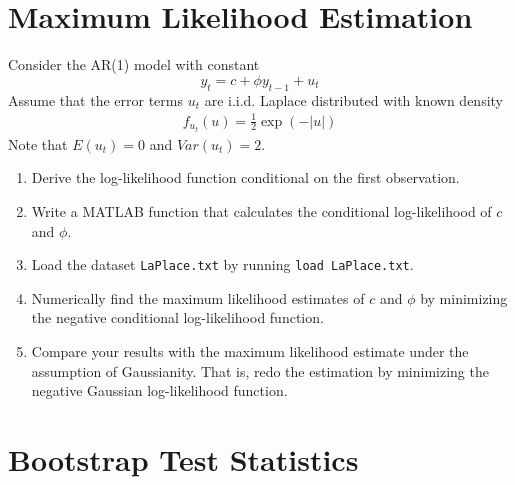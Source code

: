 \documentclass{article}
\begin{document}
\section{Maximum Likelihood Estimation}
Consider the AR(1) model with constant
$$ y_t = c + \phi y_{t-1} + u_t$$
Assume that the error terms $u_t$ are i.i.d. Laplace distributed with known density
\begin{align*}
f_{u_{t}}(u)=\frac{1}{2}\exp \left( -|u|\right)
\end{align*}
Note that $E(u_t)=0$ and $Var(u_t)=2$.
\begin{enumerate}
		\item Derive the log-likelihood function conditional on the first observation.
		\item Write a MATLAB function that calculates the conditional log-likelihood of $c$ and $\phi$.
		\item Load the dataset \texttt{LaPlace.txt} by running \texttt{load LaPlace.txt}.
		\item Numerically find the maximum likelihood estimates of $c$ and $\phi$ by minimizing the negative conditional log-likelihood function.
		\item Compare your results with the maximum likelihood estimate under the assumption of Gaussianity. That is, redo the estimation by minimizing the negative Gaussian log-likelihood function.
	\end{enumerate}
\newpage


\section{Bootstrap Test Statistics}
\end{document}
